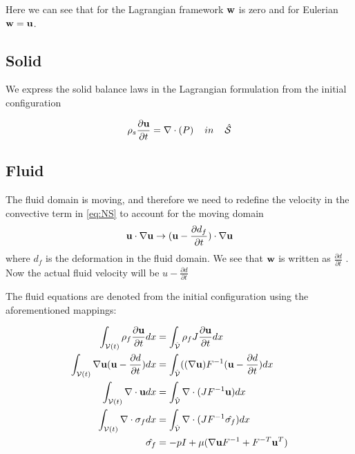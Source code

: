 Here we can see that for the Lagrangian framework $ \bold{w}$ is zero and for Eulerian $\bold{w} = \bold{u}$.

\subsection{Solid}
We express the solid balance laws in the Lagrangian formulation from the initial configuration

\begin{equation}
\rho_s \frac{\partial \bold{u}}{\partial t} = \nabla \cdot (P) \hspace{4mm}in\hspace{4mm} \hat{\mathcal{S}} 
\end{equation}

\subsection{Fluid}


The fluid domain is moving, and therefore we need to redefine the velocity in the convective term in \eqref{eq:NS} to account for the moving domain 
\begin{equation}
\bold{u} \cdot \nabla \bold{u} \rightarrow (\bold{u}-\frac{\partial d_f}{\partial t}) \cdot \nabla \bold{u}  
\end{equation}
where $d_f$ is the deformation in the fluid domain. We see that $\bold{w}$ is written as $\frac{\partial d}{\partial t}$ . Now the actual fluid velocity will be $u-\frac{\partial d}{\partial t}$ 

The fluid equations are denoted from the initial configuration using the aforementioned mappings:

\begin{align}
\int_{\mathcal{V}(t)} \rho_f \frac{\partial \bold{u}}{\partial t} dx & = \int_{\hat{\mathcal{V}}}  \rho_f J \frac{\partial \bold{u}}{\partial t} dx \\
\int_{\mathcal{V}(t)} \nabla \bold{u} (\bold{u}-\frac{\partial d}{\partial t}) dx  &= \int_{\hat{\mathcal{V}}} ((\nabla \bold{u})F^{-1}(\bold{u}-\frac{\partial d}{\partial t}) dx  \\
\int_{\mathcal{V}(t)} \nabla \cdot \bold{u} dx  &=\int_{\hat{\mathcal{V}}}  \nabla \cdot (J F^{-1} \bold{u}  ) dx \\
\int_{\mathcal{V}(t)} \nabla \cdot \sigma_f dx &= \int_{\hat{\mathcal{V}}} \nabla \cdot( J F^{-1} \hat{\sigma_f} )     dx \\
\hat{\sigma_f} &= -pI + \mu ( \nabla \bold{u} F^{-1} + F^{-T} \bold{u}^{T}  ) 
\end{align}

